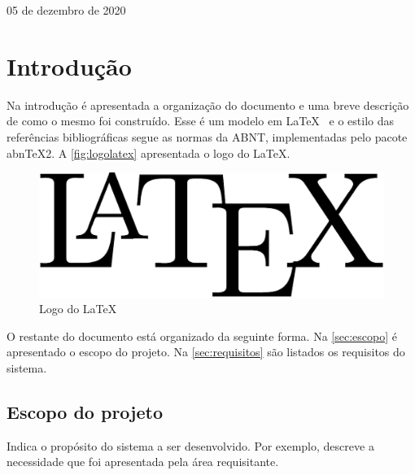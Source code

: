 \documentclass[11pt]{classes/ifscarticle}
\begin{document}
\begin{flushright}
05 de dezembro de 2020
\end{flushright}

\clearpage
\pagestyle{firstpage}

\tableofcontents
\clearpage


\section{Introdução}
\label{sec:introducao}

Na introdução é apresentada a organização do documento e uma breve descrição de como o mesmo foi construído.   Esse é um modelo em \LaTeX~ \cite{lamport94} e o estilo das referências bibliográficas segue as normas da ABNT, implementadas pelo pacote abnTeX2. A \autoref{fig:logolatex} apresentada o logo do \LaTeX.

\begin{figure}[ht]
    \centering
    \includegraphics[width=.5\linewidth]{figuras/latex-logo}
    \caption{Logo do \LaTeX}
    \label{fig:logolatex}
\end{figure}

\lipsum[1]

O restante do documento está organizado da seguinte forma. Na \autoref{sec:escopo} é apresentado o escopo do projeto. Na \autoref{sec:requisitos} são listados os requisitos do sistema.

\subsection{Escopo do projeto}
\label{sec:escopo}

Indica o propósito do sistema a ser desenvolvido. Por exemplo, descreve a necessidade que foi apresentada pela área requisitante. \lipsum[2]
\end{document}
